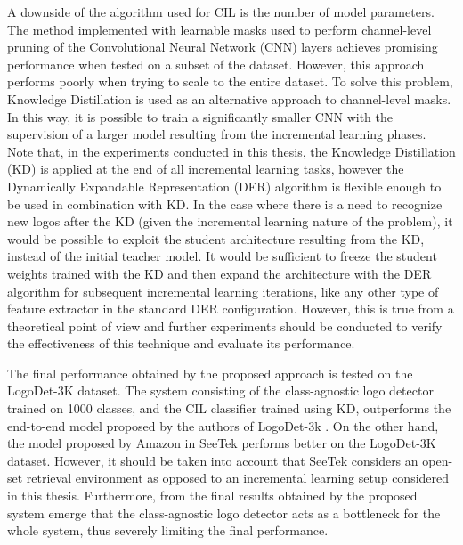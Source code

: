 A downside of the algorithm used for CIL is the number of model parameters.
The method implemented with learnable masks used to perform channel-level pruning of the Convolutional Neural Network (CNN) layers achieves promising performance when tested on a subset of the dataset.
However, this approach performs poorly when trying to scale to the entire dataset.
To solve this problem, Knowledge Distillation is used as an alternative approach to channel-level masks.
In this way, it is possible to train a significantly smaller CNN with the supervision of a larger model resulting from the incremental learning phases.
Note that, in the experiments conducted in this thesis, the Knowledge Distillation (KD) is applied at the end of all incremental learning tasks, however the Dynamically Expandable Representation (DER) algorithm \cite{yan2021dynamically} is flexible enough to be used in combination with KD.
In the case where there is a need to recognize new logos after the KD (given the incremental learning nature of the problem), it would be possible to exploit the student architecture resulting from the KD, instead of the initial teacher model.
It would be sufficient to freeze the student weights trained with the KD and then expand the architecture with the DER algorithm for subsequent incremental learning iterations, like any other type of feature extractor in the standard DER configuration.
However, this is true from a theoretical point of view and further experiments should be conducted to verify the effectiveness of this technique and evaluate its performance.

The final performance obtained by the proposed approach is tested on the LogoDet-3K dataset.
The system consisting of the class-agnostic logo detector trained on 1000 classes, and the CIL classifier trained using KD, outperforms the end-to-end model proposed by the authors of LogoDet-3k \cite{wang2022logodet}.
On the other hand, the model proposed by Amazon in SeeTek \cite{li2022seetek} performs better on the LogoDet-3K dataset. However, it should be taken into account that SeeTek considers an open-set retrieval environment as opposed to an incremental learning setup considered in this thesis.
Furthermore, from the final results obtained by the proposed system emerge that the class-agnostic logo detector acts as a bottleneck for the whole system, thus severely limiting the final performance.

